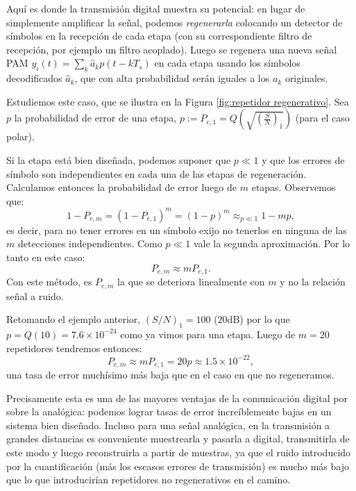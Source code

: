 Aquí es donde la transmisión digital muestra su potencial: en lugar de simplemente amplificar la señal, podemos \emph{regenerarla} colocando un detector de símbolos en la recepción de cada etapa (con su correspondiente filtro de recepción, por ejemplo un filtro acoplado). Luego se regenera una nueva señal PAM $y_i(t) = \sum_k \hat{a}_k p(t-kT_s)$ en cada etapa usando los símbolos decodificados $\hat{a}_k$, que con alta probabilidad serán iguales a los $a_k$ originales. 

Estudiemos este caso, que se ilustra en la Figura \ref{fig:repetidor regenerativo}. Sea $p$ la probabilidad de error de una etapa, $p:=P_{e,1} = Q\left(\sqrt{\left(\frac{S}{N}\right)_1}\right)$ (para el caso polar).

Si la etapa está bien diseñada, podemos suponer que $p\ll 1$ y que los errores de símbolo son independientes en cada una de las etapas de regeneración. Calculamos entonces la probabilidad de error luego de $m$ etapas. Observemos que:
\begin{equation*}
1 - P_{e,m}  = (1-P_{e,1})^m = (1-p)^m \mathop{\approx}_{p \ll 1} 1-mp,
\end{equation*}
es decir, para no tener errores en un símbolo exijo no tenerlos en ninguna de las $m$ detecciones independientes. Como $p\ll 1$ vale la segunda aproximación. Por lo tanto en este caso:
\begin{equation*}
P_{e,m} \approx m P_{e,1}.
\end{equation*}
Con este método, es $P_{e,m}$ la que se deteriora linealmente con $m$ y no la relación señal a ruido.

\begin{ejemplo}\label{ejemplo:repetidor regenerativo}
Retomando el ejemplo anterior, $(S/N)_1=100$ ($20 \unit{\deci\bel}$) por lo que $p=Q(10) = 7.6 \times 10^{-24}$ como ya vimos para una etapa. Luego de $m=20$ repetidores tendremos entonces:
\begin{equation*}
    P_{e,m} \approx m P_{e,1} = 20 p \approx 1.5 \times 10^{-22},
\end{equation*}
una tasa de error muchísimo más baja que en el caso en que no regeneramos.
\end{ejemplo}

Precisamente esta es una de las mayores ventajas de la comunicación digital por sobre la analógica: podemos lograr tasas de error increíblemente bajas en un sistema bien diseñado. Incluso para una señal analógica, en la transmisión a grandes distancias es conveniente muestrearla y pasarla a digital, transmitirla de este modo y luego reconstruirla a partir de muestras, ya que el ruido introducido por la cuantificación (más los escasos errores de transmisión) es mucho más bajo que lo que introducirían repetidores no regenerativos en el camino.